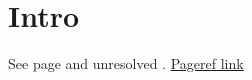 \documentclass{article}
\begin{document}
\section{Intro}
\label{sec:intro}
See page \pageref{sec:intro} and unresolved \pageref{sec:missing}.
\href{https://example.com/pageref}{Pageref link}
\end{document}
